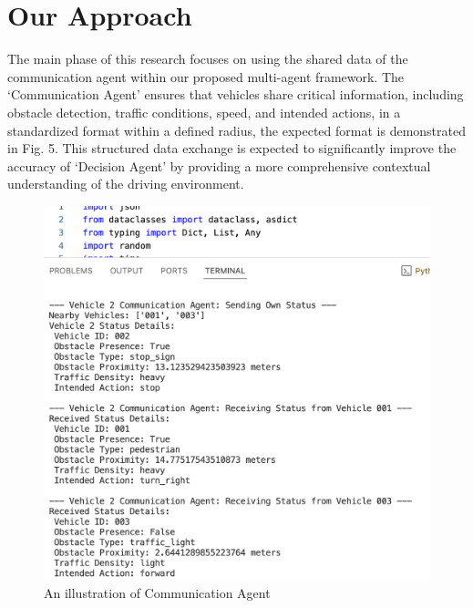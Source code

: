 \documentclass[conference]{IEEEtran}
\begin{document}
 


\section{Our Approach}
The main phase of this research focuses on using the shared data of the communication agent within our proposed multi-agent framework. The `Communication Agent' ensures that vehicles share critical information, including obstacle detection, traffic conditions, speed, and intended actions, in a standardized format within a defined radius, the expected format is demonstrated in Fig. 5. This structured data exchange is expected to significantly improve the accuracy of `Decision Agent' by providing a more comprehensive contextual understanding of the driving environment.
 \begin{figure}[!ht]
     \centering
     \includegraphics[width=\linewidth]{Fig/Commu_Agent.png}
     \caption{An illustration of Communication Agent}
     \label{fig:enter-label}
 \end{figure} 
\end{document}
